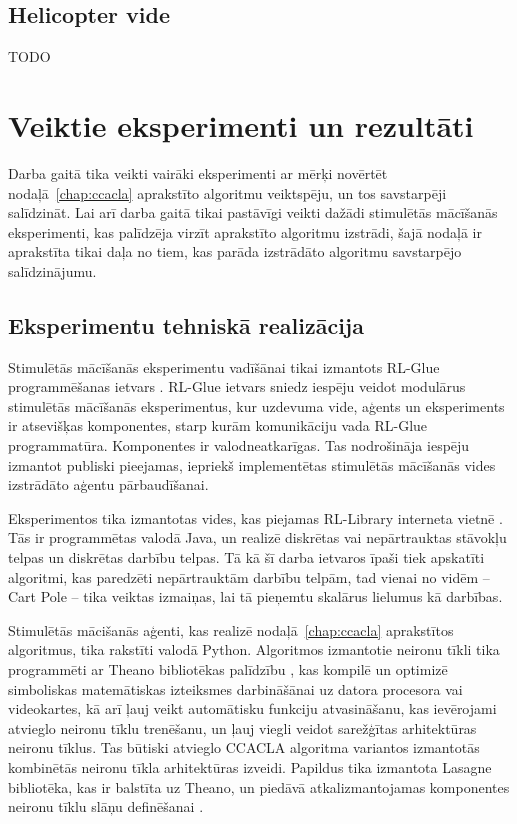 \documentclass{ludis} %
\begin{document}
\section{Helicopter vide}
TODO


\chapter{Veiktie eksperimenti un rezultāti}\label{chap:exp}
Darba gaitā tika veikti vairāki eksperimenti ar mērķi novērtēt
nodaļā~\ref{chap:ccacla} aprakstīto algoritmu veiktspēju, un tos savstarpēji
salīdzināt. Lai arī darba gaitā tikai pastāvīgi veikti dažādi stimulētās
mācīšanās eksperimenti, kas palīdzēja virzīt aprakstīto algoritmu izstrādi, šajā
nodaļā ir aprakstīta tikai daļa no tiem, kas parāda izstrādāto algoritmu
savstarpējo salīdzinājumu.

\section{Eksperimentu tehniskā realizācija}
Stimulētās mācīšanās eksperimentu vadīšānai tikai izmantots RL-Glue
programmēšanas ietvars \autocite{rl-glue}. RL-Glue ietvars sniedz iespēju veidot
modulārus stimulētās mācīšanās eksperimentus, kur uzdevuma vide, aģents un
eksperiments ir atsevišķas komponentes, starp kurām komunikāciju vada RL-Glue
programmatūra. Komponentes ir valodneatkarīgas. Tas nodrošināja iespēju izmantot
publiski pieejamas, iepriekš implementētas stimulētās mācīšanās vides izstrādāto
aģentu pārbaudīšanai. 

Eksperimentos tika izmantotas vides, kas piejamas RL-Library interneta vietnē
\autocite{rl-library}. Tās ir programmētas valodā Java, un realizē diskrētas vai
nepārtrauktas stāvokļu telpas un diskrētas darbību telpas. Tā kā šī darba
ietvaros īpaši tiek apskatīti algoritmi, kas paredzēti nepārtrauktām darbību
telpām, tad vienai no vidēm -- Cart Pole -- tika veiktas izmaiņas, lai tā
pieņemtu skalārus lielumus kā darbības.

Stimulētās mācišanās aģenti, kas realizē nodaļā~\ref{chap:ccacla} aprakstītos
algoritmus, tika rakstīti valodā Python. Algoritmos izmantotie neironu tīkli
tika programmēti ar Theano bibliotēkas palīdzību \autocite{Bastien-Theano-2012}
\autocite{bergstra+al:2010-scipy}, kas kompilē un optimizē simboliskas
matemātiskas izteiksmes darbināšānai uz datora procesora vai videokartes, kā arī
ļauj veikt automātisku funkciju atvasināšanu, kas ievērojami atvieglo neironu
tīklu trenēšanu, un ļauj viegli veidot sarežģītas arhitektūras neironu tīklus.
Tas būtiski atvieglo CCACLA algoritma variantos izmantotās kombinētās neironu
tīkla arhitektūras izveidi. Papildus tika izmantota Lasagne bibliotēka, kas ir
balstīta uz Theano, un piedāvā atkalizmantojamas komponentes neironu tīklu slāņu
definēšanai \autocite{lasagne}.
\end{document}
